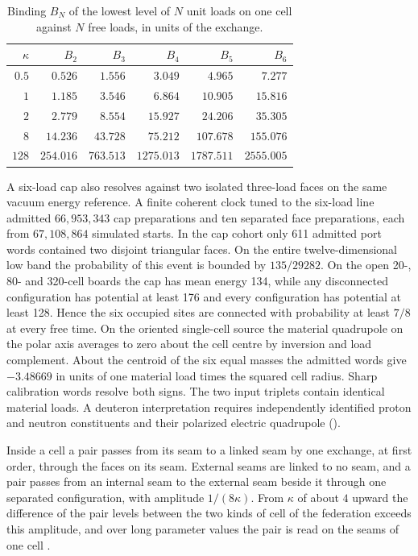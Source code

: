 \begin{table}[htbp]
\centering\small
\caption{Binding $B_N$ of the lowest level of $N$ unit loads on one cell against $N$ free
loads, in units of the exchange.}
\label{tab:cms-bindings}
\begin{tabular}{@{}rrrrrr@{}}
\toprule
$\kappa$ & $B_2$ & $B_3$ & $B_4$ & $B_5$ & $B_6$\\
\midrule
$0.5$ & $0.526$ & $1.556$ & $3.049$ & $4.965$ & $7.277$\\
$1$ & $1.185$ & $3.546$ & $6.864$ & $10.905$ & $15.816$\\
$2$ & $2.779$ & $8.554$ & $15.927$ & $24.206$ & $35.305$\\
$8$ & $14.236$ & $43.728$ & $75.212$ & $107.678$ & $155.076$\\
$128$ & $254.016$ & $763.513$ & $1275.013$ & $1787.511$ & $2555.005$\\
\bottomrule
\end{tabular}
\end{table}

A six-load cap also resolves against two isolated three-load faces on the
same vacuum energy reference. A finite coherent clock tuned to the
six-load line admitted $66{,}953{,}343$ cap preparations and ten separated
face preparations, each from $67{,}108{,}864$ simulated starts. In the cap
cohort only 611 admitted port words contained two disjoint triangular
faces. On the entire twelve-dimensional low band the probability of this
event is bounded by $135/29282$. On the open 20-, 80- and 320-cell
boards the cap has mean energy 134, while any disconnected configuration
has potential at least 176 and every configuration has potential at least
128. Hence the six occupied sites are connected with probability at least
$7/8$ at every free time. On the oriented single-cell source the material
quadrupole on the polar axis averages to zero about the cell centre by
inversion and load complement. About the centroid of the six equal masses
the admitted words give $-3.48669$ in units of one material load times
the squared cell radius. Sharp calibration words resolve both signs.
The two input triplets contain identical material loads. A deuteron
interpretation requires independently identified proton and neutron
constituents and their polarized electric quadrupole
().

Inside a cell a pair passes from its seam to a linked seam by one exchange, at first order,
through the faces on its seam. External seams are linked to no seam, and a pair passes
from an internal seam to the external seam beside it through one separated configuration,
with amplitude $1/(8\kappa)$. From $\kappa$ of about $4$ upward the difference of the pair
levels between the two kinds of cell of the federation exceeds this amplitude, and over
long parameter values the pair is read on the seams of one cell \cite{ophmodel}.

